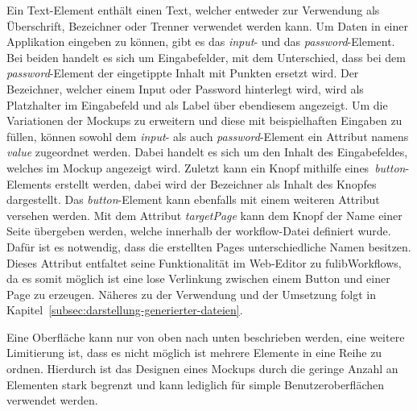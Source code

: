 Ein Text-Element enthält einen Text, welcher entweder zur Verwendung als Überschrift, Bezeichner oder Trenner verwendet werden kann.
Um Daten in einer Applikation eingeben zu können, gibt es das \textit{input}- und das \textit{password}-Element.
Bei beiden handelt es sich um Eingabefelder, mit dem Unterschied, dass bei dem \textit{password}-Element der eingetippte Inhalt mit Punkten ersetzt wird.
Der Bezeichner, welcher einem Input oder Password hinterlegt wird, wird als Platzhalter im Eingabefeld und als Label über ebendiesem angezeigt.
Um die Variationen der Mockups zu erweitern und diese mit beispielhaften Eingaben zu füllen, können sowohl dem \textit{input}- als auch \textit{password}-Element
ein Attribut namens \textit{value} zugeordnet werden.
Dabei handelt es sich um den Inhalt des Eingabefeldes, welches im Mockup angezeigt wird.
Zuletzt kann ein Knopf mithilfe eines~\textit{button}-Elements erstellt werden, dabei wird der Bezeichner als Inhalt des Knopfes dargestellt.
Das \textit{button}-Element kann ebenfalls mit einem weiteren Attribut versehen werden.
Mit dem Attribut \textit{targetPage} kann dem Knopf der Name einer Seite übergeben werden, welche innerhalb der workflow-Datei definiert wurde.
Dafür ist es notwendig, dass die erstellten Pages unterschiedliche Namen besitzen.
Dieses Attribut entfaltet seine Funktionalität im Web-Editor zu fulibWorkflows, da es somit möglich ist eine lose Verlinkung zwischen einem Button und einer Page
zu erzeugen.
Näheres zu der Verwendung und der Umsetzung folgt in Kapitel~\ref{subsec:darstellung-generierter-dateien}.

Eine Oberfläche kann nur von oben nach unten beschrieben werden, eine weitere Limitierung ist, dass es nicht möglich ist mehrere Elemente in eine Reihe zu ordnen.
Hierdurch ist das Designen eines Mockups durch die geringe Anzahl an Elementen stark begrenzt und kann lediglich für
simple Benutzeroberflächen verwendet werden.
